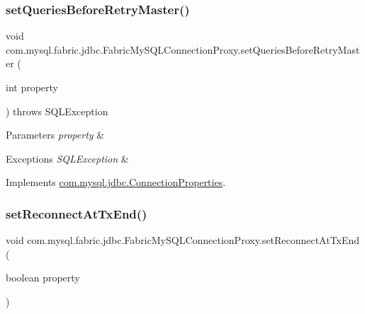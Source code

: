 \subsubsection{\texorpdfstring{set\+Queries\+Before\+Retry\+Master()}{setQueriesBeforeRetryMaster()}}
{\footnotesize\ttfamily void com.\+mysql.\+fabric.\+jdbc.\+Fabric\+My\+S\+Q\+L\+Connection\+Proxy.\+set\+Queries\+Before\+Retry\+Master (\begin{DoxyParamCaption}\item[{int}]{property }\end{DoxyParamCaption}) throws S\+Q\+L\+Exception}


\begin{DoxyParams}{Parameters}
{\em property} & \\
\hline
\end{DoxyParams}

\begin{DoxyExceptions}{Exceptions}
{\em S\+Q\+L\+Exception} & \\
\hline
\end{DoxyExceptions}


Implements \mbox{\hyperlink{interfacecom_1_1mysql_1_1jdbc_1_1_connection_properties_a957986bd12af4715d9b9bb097109a61b}{com.\+mysql.\+jdbc.\+Connection\+Properties}}.

\mbox{\label{classcom_1_1mysql_1_1fabric_1_1jdbc_1_1_fabric_my_s_q_l_connection_proxy_a153cc93828f12582dd13b0ec5e44f5ec}} 
\subsubsection{\texorpdfstring{set\+Reconnect\+At\+Tx\+End()}{setReconnectAtTxEnd()}}
{\footnotesize\ttfamily void com.\+mysql.\+fabric.\+jdbc.\+Fabric\+My\+S\+Q\+L\+Connection\+Proxy.\+set\+Reconnect\+At\+Tx\+End (\begin{DoxyParamCaption}\item[{boolean}]{property }\end{DoxyParamCaption})}


